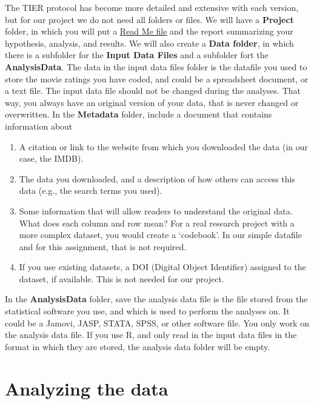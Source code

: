 \documentclass[
  oneside]{krantz}
\begin{document}
The TIER protocol has become more detailed and extensive with each version, but for our project we do not need all folders or files. We will have a \textbf{Project} folder, in which you will put a \href{https://www.projecttier.org/tier-protocol/protocol-4-0/root/readme/}{Read Me file} and the report summarizing your hypothesis, analysis, and results. We will also create a \textbf{Data folder}, in which there is a subfolder for the \textbf{Input Data Files} and a subfolder fort the \textbf{AnalysisData}. The data in the input data files folder is the datafile you used to store the movie ratings you have coded, and could be a spreadsheet document, or a text file. The input data file should not be changed during the analyses. That way, you always have an original version of your data, that is never changed or overwritten. In the \textbf{Metadata} folder, include a document that contains information about

\begin{enumerate}
\def\labelenumi{\arabic{enumi}.}
\item
  A citation or link to the website from which you downloaded the data (in our case, the IMDB).
\item
  The data you downloaded, and a description of how others can access this data (e.g., the search terms you used).
\item
  Some information that will allow readers to understand the original data. What does each column and row mean? For a real research project with a more complex dataset, you would create a `codebook'. In our simple datafile and for this assignment, that is not required.
\item
  If you use existing datasets, a DOI (Digital Object Identifier) assigned to the dataset, if available. This is not needed for our project.
\end{enumerate}

In the \textbf{AnalysisData} folder, save the analysis data file is the file stored from the statistical software you use, and which is used to perform the analyses on. It could be a Jamovi, JASP, STATA, SPSS, or other software file. You only work on the analysis data file. If you use R, and only read in the input data files in the format in which they are stored, the analysis data folder will be empty.

\hypertarget{analyzing-the-data}{%
\section{Analyzing the data}\label{analyzing-the-data}}
\end{document}
